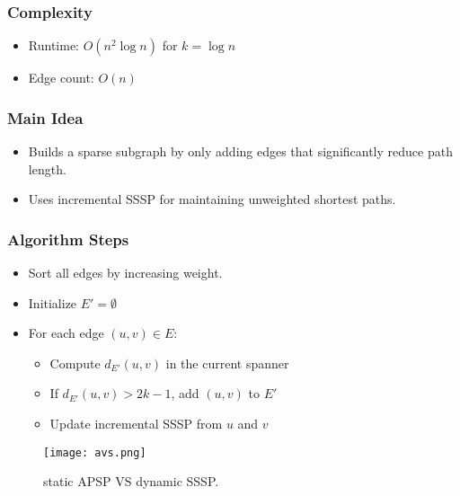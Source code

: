 \documentclass[11pt]{article}
\begin{document}
\subsubsection*{Complexity}
\begin{itemize}
    \item Runtime: \( O(n^2 \log n) \) for \( k = \log n \)
    \item Edge count: \( O(n) \)
\end{itemize}

\subsubsection*{Main Idea}
\begin{itemize}
    \item Builds a sparse subgraph by only adding edges that significantly reduce path length.
    \item Uses incremental SSSP for maintaining unweighted shortest paths.
\end{itemize}

\subsubsection*{Algorithm Steps}
\begin{itemize}
    \item Sort all edges by increasing weight.
    \item Initialize \( E' = \emptyset \)
    \item For each edge \( (u, v) \in E \):
    \begin{itemize}
        \item Compute \( d_{E'}(u, v) \) in the current spanner
        \item If \( d_{E'}(u, v) > 2k - 1 \), add \( (u, v) \) to \( E' \)
        \item Update incremental SSSP from \( u \) and \( v \)
    \end{itemize}
\end{itemize}

\begin{figure}[h] %
    \centering
    \texttt{[image: avs.png]} %
    \caption{static APSP VS dynamic SSSP.}
    \label{fig:sample}
\end{figure}
\end{document}
